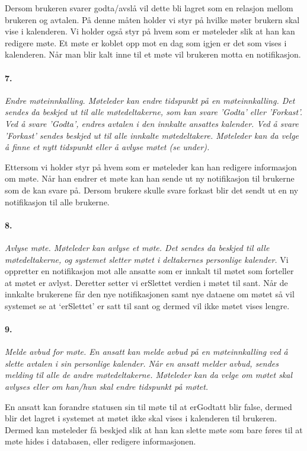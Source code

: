 \documentclass[titlepage]{article}
\begin{document}
Dersom brukeren svarer godta/avslå vil dette bli lagret som en relasjon mellom brukeren og avtalen. På denne måten holder vi styr på hvilke møter brukern skal vise i kalenderen. Vi holder også styr på hvem som er møteleder slik at han kan redigere møte. Et møte er koblet opp mot en dag som igjen er det som vises i kalenderen. Når man blir kalt inne til et møte vil brukeren motta en notifikasjon.


\paragraph{7.}\textit{ Endre møteinnkalling. Møteleder kan endre tidspunkt på en møteinnkalling. Det
sendes da beskjed ut til alle møtedeltakerne, som kan svare 'Godta' eller 'Forkast'. Ved
å svare 'Godta', endres avtalen i den innkalte ansattes kalender. Ved å svare 'Forkast'
sendes beskjed ut til alle innkalte møtedeltakere. Møteleder kan da velge å finne et
nytt tidspunkt eller å avlyse møtet (se under).}

Ettersom vi holder styr på hvem som er møteleder kan han redigere informasjon om møte. Når han endrer et møte kan han sende ut ny notifikasjon til brukerne som de kan svare på. Dersom brukere skulle svare forkast blir det sendt ut en ny notifikasjon til alle brukerne.

\paragraph{8.}\textit{ Avlyse møte. Møteleder kan avlyse et møte. Det sendes da beskjed til alle
møtedeltakerne, og systemet sletter møtet i deltakernes personlige kalender.}
Vi oppretter en notifikasjon mot alle ansatte som er innkalt til møtet som forteller at møtet er avlyst. Deretter setter vi erSlettet verdien i møtet til sant. Når de innkalte brukerene får den nye notifikasjonen samt nye dataene om møtet så vil systemet se at ‘erSlettet’ er satt til sant og dermed vil ikke møtet vises lengre.

\paragraph{9.}\textit{ Melde avbud for møte. En ansatt kan melde avbud på en møteinnkalling ved å slette avtalen i sin personlige kalender. Når en ansatt melder avbud, sendes melding til alle de andre møtedeltakerne. Møteleder kan da velge om møtet skal avlyses eller om
han/hun skal endre tidspunkt på møtet.}

En ansatt kan forandre statusen sin til møte til at erGodtatt blir false, dermed blir det lagret i systemet at møtet ikke skal vises i kalenderen til brukeren. Dermed kan møteleder få beskjed slik at han kan slette møte som bare føres til at møte hides i databasen, eller redigere informasjonen.
\end{document}
